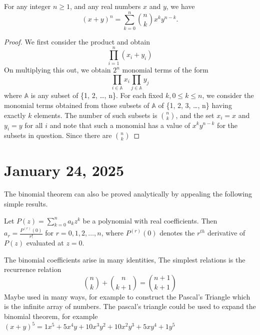 \documentclass[11pt]{article}
\begin{document}
\begin{theorem}\label{1.22}
	For any integer \(n \geqslant 1\), and any real numbers \(x\) and \(y\), we have
	\[
		(x + y)^n = \sum_{k = 0}^{n} \binom{n}{k} x^k y^{n - k}.
	\]
\end{theorem}
\begin{proof}
	We first consider the product and obtain
	\[\prod_{ i = 1}^{n} (x_i + y_i)\]
	On multiplying this out, we obtain \(2^n\) monomial terms of the form
	\[
		\prod_{i \in \mathbb{A}} x_i \prod_{j \in \mathbb{A}} y_j
	\]
	where \(\mathbb{A}\) is any subset of \{1, 2, \ldots, n\}. For each fixed \(k,
	0 \leqslant k \leqslant n\), we consider the monomial terms obtained from those
	subsets of \(\mathbb{A}\) of \{1, 2, 3, \ldots, n\} having exactly \(k\)
	elements. The number of such subsets is \(\binom{n}{k}\), and the set \(x_i =
	x\) and \(y_i = y\) for all \(i\) and note that such a monomial has a value of
	\(x^k y^{n - k}\) for the subsets in question. Since there are \(\binom{n}{k}\)
\end{proof}
\section{January 24, 2025}
The binomial theorem can also be proved analytically by appealing the following
simple results.
\begin{lemma}\label{1.23}
	Let \(P(z) = \sum_{k = 0}^{n} a_k z^k\) be a polynomial with real coefficients. Then \(a_r = \frac{P^{(r)}(0)}{r!}\) for \(r = 0, 1, 2, \ldots, n\), where \(P^{(r)}(0)\) denotes the \(r^{th}\) derivative of \(P(z)\) evaluated at \(z = 0\).
\end{lemma}

The binomial coefficients arise in many identities, The simplest relations is
the recurrence relation
\[
	\binom{n}{k} + \binom{n}{k + 1} = \binom{n + 1}{k + 1}
\]
Maybe used in many ways, for example to construct the Pascal's Triangle which
is the infinite array of numbers. The pascal's triangle could be used to expand
the binomial theorem, for example \({(x + y)}^5 = 1x^5 + 5x^4y + 10x^3y^2 +
10x^2y^3 + 5xy^4 + 1y^5\) \\
\begin{center}
\end{center}
\end{document}

